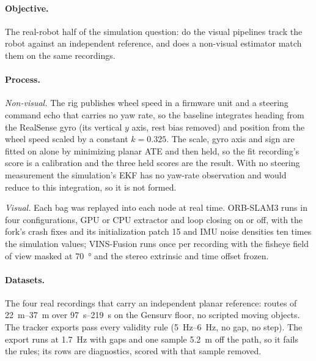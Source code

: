 \documentclass[11pt,a4paper,notitlepage]{report}
\begin{document}

\paragraph{Objective.} The real-robot half of the simulation question: do the
visual pipelines track the robot against an independent reference, and does a
non-visual estimator match them on the same recordings.

\paragraph{Process.} \emph{Non-visual.} The rig publishes wheel speed in a
firmware unit and a steering command echo that carries no yaw rate, so the
baseline integrates heading from the RealSense gyro (its vertical $y$ axis,
rest bias removed) and position from the wheel speed scaled by a constant
$k = 0.325$. The scale, gyro axis and sign are fitted on 
alone by minimizing planar ATE and then held, so the fit recording's score is
a calibration and the three held scores are the result. With no steering
measurement the simulation's EKF has no yaw-rate observation and would reduce
to this integration, so it is not formed.

\emph{Visual.} Each bag was replayed into each node at real time. ORB-SLAM3
runs in four configurations, GPU or CPU extractor and loop closing on or off,
with the fork's crash fixes and its initialization patch 15 and IMU noise densities ten times the
simulation values; VINS-Fusion runs once per recording with the fisheye field
of view masked at \SI{70}{\degree} and the stereo extrinsic and time offset
frozen.

\paragraph{Datasets.} The four real recordings that carry an independent
planar reference: routes of \SIrange{22}{37}{\metre} over
\SIrange{97}{219}{\second} on the Gensurv floor, no scripted moving objects.
The  tracker exports pass every validity rule
(\SIrange{5}{6}{\hertz}, no gap, no step). The  export runs at
\SI{1.7}{\hertz} with gaps and one sample \SI{5.2}{\metre} off the path, so it
fails the rules; its rows are diagnostics, scored with that sample removed.
\end{document}
